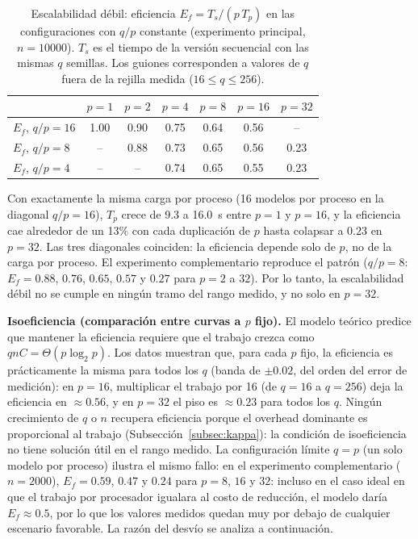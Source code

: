 \documentclass[11pt, a4paper]{article}
\begin{document}
\begin{table}[H]
\centering
\caption{Escalabilidad débil: eficiencia $E_f = T_s/(p\,T_p)$ en las configuraciones con $q/p$ constante (experimento principal, $n = 10000$). $T_s$ es el tiempo de la versión secuencial con las mismas $q$ semillas. Los guiones corresponden a valores de $q$ fuera de la rejilla medida ($16 \le q \le 256$).}
\label{tab:debil}
\begin{tabular}{lcccccc}
\toprule
& $p=1$ & $p=2$ & $p=4$ & $p=8$ & $p=16$ & $p=32$ \\
\midrule
$E_f$, $q/p = 16$ & 1.00 & 0.90 & 0.75 & 0.64 & 0.56 & -- \\
$E_f$, $q/p = 8$  & --   & 0.88 & 0.73 & 0.65 & 0.56 & 0.23 \\
$E_f$, $q/p = 4$  & --   & --   & 0.74 & 0.65 & 0.55 & 0.23 \\
\bottomrule
\end{tabular}
\end{table}

Con exactamente la misma carga por proceso (16 modelos por proceso en la diagonal $q/p = 16$), $T_p$ crece de 9.3 a 16.0~s entre $p = 1$ y $p = 16$, y la eficiencia cae alrededor de un 13\% con cada duplicación de $p$ hasta colapsar a $0.23$ en $p = 32$. Las tres diagonales coinciden: la eficiencia depende solo de $p$, no de la carga por proceso. El experimento complementario reproduce el patrón ($q/p = 8$: $E_f = 0.88$, $0.76$, $0.65$, $0.57$ y $0.27$ para $p = 2$ a $32$). Por lo tanto, la escalabilidad débil no se cumple en ningún tramo del rango medido, y no solo en $p = 32$.

\textbf{Isoeficiencia (comparación entre curvas a $p$ fijo).} El modelo teórico predice que mantener la eficiencia requiere que el trabajo crezca como $qnC=\Theta(p\log_2 p)$. Los datos muestran que, para cada $p$ fijo, la eficiencia es prácticamente la misma para todos los $q$ (banda de $\pm 0.02$, del orden del error de medición): en $p = 16$, multiplicar el trabajo por 16 (de $q = 16$ a $q = 256$) deja la eficiencia en $\approx 0.56$, y en $p = 32$ el piso es $\approx 0.23$ para todos los $q$. Ningún crecimiento de $q$ o $n$ recupera eficiencia porque el overhead dominante es proporcional al trabajo (Subsección~\ref{subsec:kappa}): la condición de isoeficiencia no tiene solución útil en el rango medido. La configuración límite $q = p$ (un solo modelo por proceso) ilustra el mismo fallo: en el experimento complementario ($n = 2000$), $E_f = 0.59$, $0.47$ y $0.24$ para $p = 8$, $16$ y $32$: incluso en el caso ideal en que el trabajo por procesador igualara al costo de reducción, el modelo daría $E_f \approx 0.5$, por lo que los valores medidos quedan muy por debajo de cualquier escenario favorable. La razón del desvío se analiza a continuación.
\end{document}
